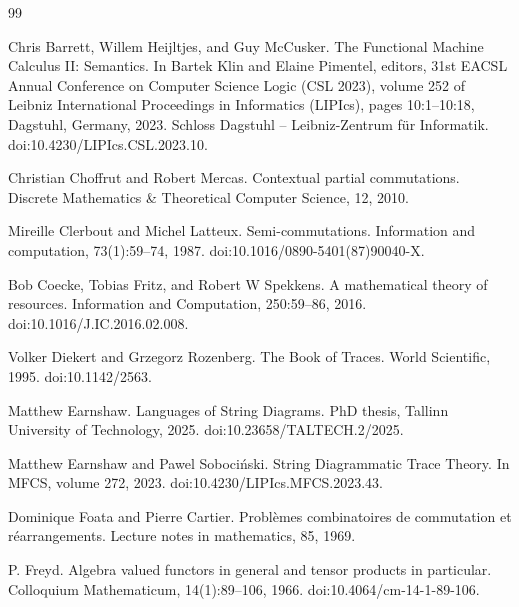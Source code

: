 \begin{thebibliography}{99}
\par\noindent    Chris Barrett, Willem Heijltjes, and Guy McCusker.  The Functional Machine Calculus II: Semantics.  In Bartek Klin and Elaine Pimentel, editors, 31st EACSL Annual Conference on Computer Science Logic (CSL 2023), volume 252 of Leibniz International Proceedings in Informatics (LIPIcs), pages 10:1--10:18, Dagstuhl, Germany, 2023. Schloss Dagstuhl -- Leibniz-Zentrum für Informatik.  doi:10.4230/LIPIcs.CSL.2023.10.  

\par\noindent    Christian Choffrut and Robert Mercas.  Contextual partial commutations.  Discrete Mathematics \& Theoretical Computer Science, 12, 2010.  

\par\noindent    Mireille Clerbout and Michel Latteux.  Semi-commutations.  Information and computation, 73(1):59--74, 1987.  doi:10.1016/0890-5401(87)90040-X.  

\par\noindent    Bob Coecke, Tobias Fritz, and Robert W Spekkens.  A mathematical theory of resources.  Information and Computation, 250:59--86, 2016.  doi:10.1016/J.IC.2016.02.008.  

\par\noindent    Volker Diekert and Grzegorz Rozenberg.  The Book of Traces.  World Scientific, 1995.  doi:10.1142/2563.  

\par\noindent    Matthew Earnshaw.  Languages of String Diagrams.  PhD thesis, Tallinn University of Technology, 2025.  doi:10.23658/TALTECH.2/2025.  

\par\noindent    Matthew Earnshaw and Pawel Sobociński.  String Diagrammatic Trace Theory.  In MFCS, volume 272, 2023.  doi:10.4230/LIPIcs.MFCS.2023.43.  

\par\noindent    Dominique Foata and Pierre Cartier.  Problèmes combinatoires de commutation et réarrangements.  Lecture notes in mathematics, 85, 1969.  

\par\noindent    P. Freyd.  Algebra valued functors in general and tensor products in particular.  Colloquium Mathematicum, 14(1):89--106, 1966.  doi:10.4064/cm-14-1-89-106.  


\end{thebibliography}
